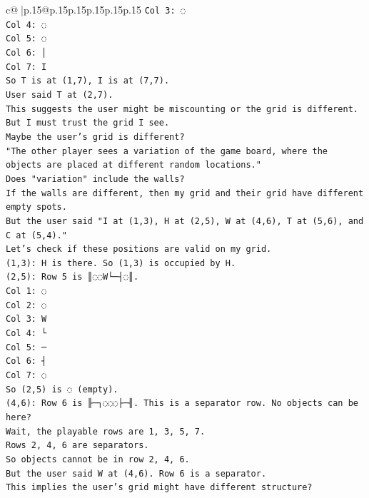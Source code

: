 \documentclass{article}
\begin{document}
{\begin{supertabular}{c@{$\;$}|p{.15\linewidth}@{}p{.15\linewidth}p{.15\linewidth}p{.15\linewidth}p{.15\linewidth}p{.15\linewidth}}
{{{\texttt{Col 3: ◌} \\
\texttt{Col 4: ◌} \\
\texttt{Col 5: ◌} \\
\texttt{Col 6: │} \\
\texttt{Col 7: I} \\
\texttt{So T is at (1,7), I is at (7,7).} \\
\texttt{User said T at (2,7).} \\
\texttt{This suggests the user might be miscounting or the grid is different.} \\
\texttt{But I must trust the grid I see.} \\
\texttt{Maybe the user's grid is different?} \\
\texttt{"The other player sees a variation of the game board, where the objects are placed at different random locations."} \\
\texttt{Does "variation" include the walls?} \\
\texttt{If the walls are different, then my grid and their grid have different empty spots.} \\
\texttt{But the user said "I at (1,3), H at (2,5), W at (4,6), T at (5,6), and C at (5,4)."} \\
\texttt{Let's check if these positions are valid on my grid.} \\
\texttt{(1,3): H is there. So (1,3) is occupied by H.} \\
\texttt{(2,5): Row 5 is ║◌◌W└─┤◌║.} \\
\texttt{Col 1: ◌} \\
\texttt{Col 2: ◌} \\
\texttt{Col 3: W} \\
\texttt{Col 4: └} \\
\texttt{Col 5: ─} \\
\texttt{Col 6: ┤} \\
\texttt{Col 7: ◌} \\
\texttt{So (2,5) is ◌ (empty).} \\
\texttt{(4,6): Row 6 is ╟─┐◌◌◌├─╢. This is a separator row. No objects can be here?} \\
\texttt{Wait, the playable rows are 1, 3, 5, 7.} \\
\texttt{Rows 2, 4, 6 are separators.} \\
\texttt{So objects cannot be in row 2, 4, 6.} \\
\texttt{But the user said W at (4,6). Row 6 is a separator.} \\
\texttt{This implies the user's grid might have different structure?} \\
}}}
\end{supertabular}}
\end{document}
